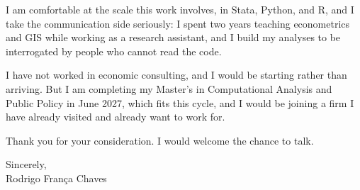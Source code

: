 I am comfortable at the scale this work involves, in Stata, Python, and R, and I take the communication side seriously: I spent two years teaching econometrics and GIS while working as a research assistant, and I build my analyses to be interrogated by people who cannot read the code.

I have not worked in economic consulting, and I would be starting rather than arriving. But I am completing my Master's in Computational Analysis and Public Policy in June 2027, which fits this cycle, and I would be joining a firm I have already visited and already want to work for.

Thank you for your consideration. I would welcome the chance to talk.

\vspace{6pt}

Sincerely, \\
Rodrigo França Chaves


